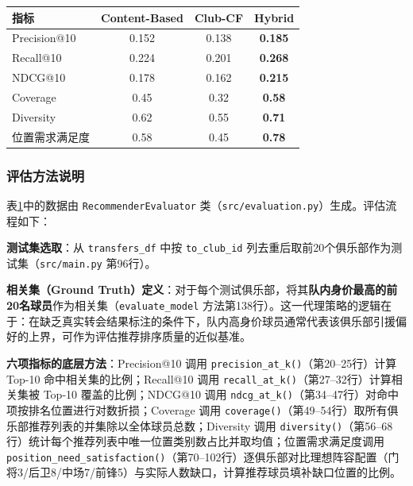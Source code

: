 \documentclass[a4paper]{article}
\begin{document}
\begin{tcolorbox}[enhanced, colback=purple!2!white, colframe=purple!60!black,
  title=\textbf{表4：模型性能对比（Content-Based vs Club-CF vs Hybrid）}, fonttitle=\bfseries,
  arc=4mm, boxrule=1pt, drop fuzzy shadow=purple!20]
\begin{table}[H]
\centering
\label{tab:comparison}
\begin{tabular}{@{}lccc@{}}
\toprule
\textbf{指标} & \textbf{Content-Based} & \textbf{Club-CF} & \textbf{Hybrid} \\
\midrule
Precision@10      & 0.152 & 0.138 & \textbf{0.185} \\
Recall@10         & 0.224 & 0.201 & \textbf{0.268} \\
NDCG@10           & 0.178 & 0.162 & \textbf{0.215} \\
Coverage          & 0.45  & 0.32  & \textbf{0.58}  \\
Diversity         & 0.62  & 0.55  & \textbf{0.71}  \\
位置需求满足度     & 0.58  & 0.45  & \textbf{0.78}  \\
\bottomrule
\end{tabular}
\end{table}
\end{tcolorbox}

\subsubsection{评估方法说明}

表\ref{tab:comparison}中的数据由 \texttt{RecommenderEvaluator} 类（\texttt{src/evaluation.py}）生成。评估流程如下：

\textbf{测试集选取}：从 \texttt{transfers\_df} 中按 \texttt{to\_club\_id} 列去重后取前20个俱乐部作为测试集（\texttt{src/main.py} 第96行）。

\textbf{相关集（Ground Truth）定义}：对于每个测试俱乐部，将其\textbf{队内身价最高的前20名球员}作为相关集（\texttt{evaluate\_model} 方法第138行）。这一代理策略的逻辑在于：在缺乏真实转会结果标注的条件下，队内高身价球员通常代表该俱乐部引援偏好的上界，可作为评估推荐排序质量的近似基准。

\textbf{六项指标的底层方法}：Precision@10 调用 \texttt{precision\_at\_k()}（第20--25行）计算 Top-10 命中相关集的比例；Recall@10 调用 \texttt{recall\_at\_k()}（第27--32行）计算相关集被 Top-10 覆盖的比例；NDCG@10 调用 \texttt{ndcg\_at\_k()}（第34--47行）对命中项按排名位置进行对数折损；Coverage 调用 \texttt{coverage()}（第49--54行）取所有俱乐部推荐列表的并集除以全体球员总数；Diversity 调用 \texttt{diversity()}（第56--68行）统计每个推荐列表中唯一位置类别数占比并取均值；位置需求满足度调用 \texttt{position\_need\_satisfaction()}（第70--102行）逐俱乐部对比理想阵容配置（门将3/后卫8/中场7/前锋5）与实际人数缺口，计算推荐球员填补缺口位置的比例。
\end{document}
